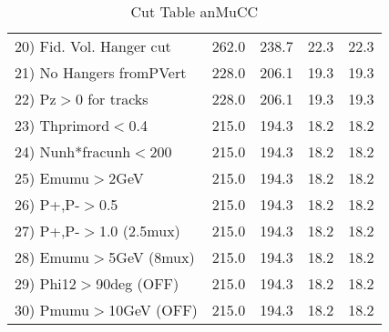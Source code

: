 \begin{table}[h!]
\begin{tabular}{||l||r|r|r|r||}
 20) Fid. Vol. Hanger cut &       262.0 &       238.7 &        22.3 &        22.3 \\
 21) No Hangers fromPVert &       228.0 &       206.1 &        19.3 &        19.3 \\
 22) Pz$>$0 for tracks    &       228.0 &       206.1 &        19.3 &        19.3 \\
 23) Thprimord$<$0.4      &       215.0 &       194.3 &        18.2 &        18.2 \\
 24) Nunh*fracunh$<$200   &       215.0 &       194.3 &        18.2 &        18.2 \\
 25) Emumu$>$2GeV         &       215.0 &       194.3 &        18.2 &        18.2 \\
 26) P+,P-$>$0.5          &       215.0 &       194.3 &        18.2 &        18.2 \\
 27) P+,P-$>$1.0 (2.5mux) &       215.0 &       194.3 &        18.2 &        18.2 \\
 28) Emumu$>$5GeV  (8mux) &       215.0 &       194.3 &        18.2 &        18.2 \\
 29) Phi12$>$90deg  (OFF) &       215.0 &       194.3 &        18.2 &        18.2 \\
 30) Pmumu$>$10GeV  (OFF) &       215.0 &       194.3 &        18.2 &        18.2 \\
 \hline
 \hline
 \end{tabular}
 \caption{Cut Table  anMuCC }
 \label{tab-cut_anmcc}
 \end{table}
